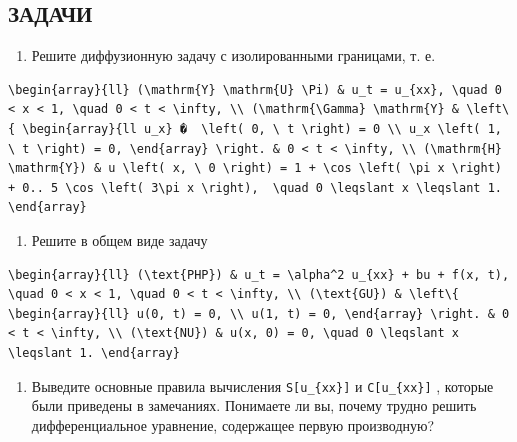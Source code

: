\documentclass[
  ukrainian,
]{article}
\providecommand{\tightlist}{%
  \setlength{\itemsep}{0pt}\setlength{\parskip}{0pt}}
\begin{document}
\subsection{ЗАДАЧИ}\label{ux437ux430ux434ux430ux447ux438-4}

\begin{enumerate}
\def\labelenumi{\arabic{enumi}.}
\tightlist
\item
  Решите диффузионную задачу с изолированными границами, т. е.
\end{enumerate}

\begin{verbatim}
\begin{array}{ll} (\mathrm{Y} \mathrm{U} \Pi) & u_t = u_{xx}, \quad 0 < x < 1, \quad 0 < t < \infty, \\ (\mathrm{\Gamma} \mathrm{Y} & \left\{ \begin{array}{ll u_x} �  \left( 0, \ t \right) = 0 \\ u_x \left( 1, \ t \right) = 0, \end{array} \right. & 0 < t < \infty, \\ (\mathrm{H} \mathrm{Y}) & u \left( x, \ 0 \right) = 1 + \cos \left( \pi x \right) + 0.. 5 \cos \left( 3\pi x \right),  \quad 0 \leqslant x \leqslant 1. \end{array}
\end{verbatim}

\begin{enumerate}
\def\labelenumi{\arabic{enumi}.}
\setcounter{enumi}{1}
\tightlist
\item
  Решите в общем виде задачу
\end{enumerate}

\begin{verbatim}
\begin{array}{ll} (\text{PHP}) & u_t = \alpha^2 u_{xx} + bu + f(x, t), \quad 0 < x < 1, \quad 0 < t < \infty, \\ (\text{GU}) & \left\{ \begin{array}{ll} u(0, t) = 0, \\ u(1, t) = 0, \end{array} \right. & 0 < t < \infty, \\ (\text{NU}) & u(x, 0) = 0, \quad 0 \leqslant x \leqslant 1. \end{array}
\end{verbatim}

\begin{enumerate}
\def\labelenumi{\arabic{enumi}.}
\setcounter{enumi}{2}
\tightlist
\item
  Выведите основные правила вычисления \texttt{S{[}u\_\{xx\}{]}} и
  \texttt{C{[}u\_\{xx\}{]}} , которые были приведены в замечаниях.
  Понимаете ли вы, почему трудно решить дифференциальное уравнение,
  содержащее первую производную?
\end{enumerate}
\end{document}
